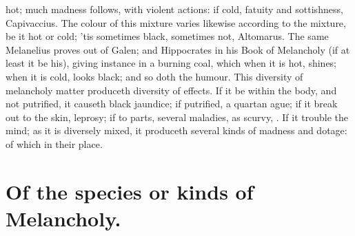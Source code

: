 {{hot; much madness follows, with violent actions: if cold, fatuity and
sottishness, Capivaccius. The colour of this mixture varies
likewise according to the mixture, be it hot or cold; 'tis sometimes
black, sometimes not, Altomarus. The same Melanelius proves out
of Galen; and Hippocrates in his Book of Melancholy (if at least it be
his), giving instance in a burning coal, which when it is hot, shines;
when it is cold, looks black; and so doth the humour. This diversity of
melancholy matter produceth diversity of effects. If it be within the
body, and not putrified, it causeth black jaundice; if putrified,
a quartan ague; if it break out to the skin, leprosy; if to parts,
several maladies, as scurvy, \etc{}. If it trouble the mind; as it is
diversely mixed, it produceth several kinds of madness and dotage: of
which in their place.

\section{Of the species or kinds of Melancholy.}

}}
